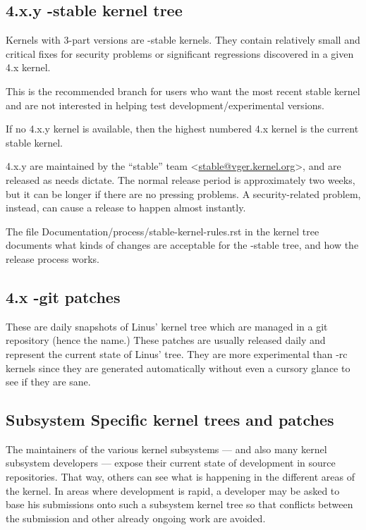 \documentclass[a4paper,8pt,english]{sphinxmanual}
\begin{document}
\subsection{4.x.y -stable kernel tree}
\label{process/howto:x-y-stable-kernel-tree}
Kernels with 3-part versions are -stable kernels. They contain
relatively small and critical fixes for security problems or significant
regressions discovered in a given 4.x kernel.

This is the recommended branch for users who want the most recent stable
kernel and are not interested in helping test development/experimental
versions.

If no 4.x.y kernel is available, then the highest numbered 4.x
kernel is the current stable kernel.

4.x.y are maintained by the ``stable'' team \textless{}\href{mailto:stable@vger.kernel.org}{stable@vger.kernel.org}\textgreater{}, and
are released as needs dictate.  The normal release period is approximately
two weeks, but it can be longer if there are no pressing problems.  A
security-related problem, instead, can cause a release to happen almost
instantly.

The file Documentation/process/stable-kernel-rules.rst in the kernel tree
documents what kinds of changes are acceptable for the -stable tree, and
how the release process works.


\subsection{4.x -git patches}
\label{process/howto:x-git-patches}
These are daily snapshots of Linus' kernel tree which are managed in a
git repository (hence the name.) These patches are usually released
daily and represent the current state of Linus' tree.  They are more
experimental than -rc kernels since they are generated automatically
without even a cursory glance to see if they are sane.


\subsection{Subsystem Specific kernel trees and patches}
\label{process/howto:subsystem-specific-kernel-trees-and-patches}
The maintainers of the various kernel subsystems --- and also many
kernel subsystem developers --- expose their current state of
development in source repositories.  That way, others can see what is
happening in the different areas of the kernel.  In areas where
development is rapid, a developer may be asked to base his submissions
onto such a subsystem kernel tree so that conflicts between the
submission and other already ongoing work are avoided.
\end{document}
